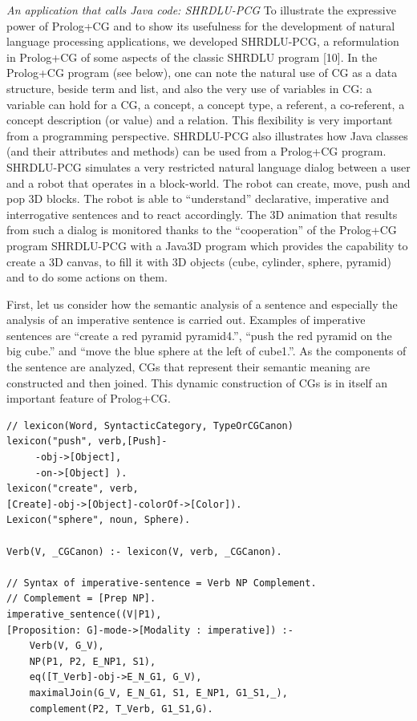 \documentclass{book}
\begin{document}
{\it An application that calls Java code: SHRDLU-PCG} To
illustrate the expressive power of Prolog+CG and to show its
usefulness for the development of natural language processing
applications, we developed SHRDLU-PCG, a reformulation in Prolog+CG of
some aspects of the classic SHRDLU program [10]. In the Prolog+CG
program (see below), one can note the natural use of CG as a data
structure, beside term and list, and also the very use of variables in
CG: a variable can hold for a CG, a concept, a concept type, a
referent, a co-referent, a concept description (or value) and a
relation. This flexibility is very important from a programming
perspective.  SHRDLU-PCG also illustrates how Java classes (and their
attributes and methods) can be used from a Prolog+CG program.
SHRDLU-PCG simulates a very restricted natural language dialog between
a user and a robot that operates in a block-world. The robot can
create, move, push and pop 3D blocks. The robot is able to
``understand'' declarative, imperative and interrogative sentences and
to react accordingly. The 3D animation that results from such a dialog
is monitored thanks to the ``cooperation'' of the Prolog+CG program
SHRDLU-PCG with a Java3D program which provides the capability to
create a 3D canvas, to fill it with 3D objects (cube, cylinder,
sphere, pyramid) and to do some actions on them.

First, let us consider how the semantic analysis of a sentence and
especially the analysis of an imperative sentence is carried out.
Examples of imperative sentences are ``create a red pyramid
pyramid4.'', ``push the red pyramid on the big cube.'' and ``move the
blue sphere at the left of cube1.''.  As the components of the
sentence are analyzed, CGs that represent their semantic meaning are
constructed and then joined. This dynamic construction of CGs is in
itself an important feature of Prolog+CG.


 
\begin{verbatim}
// lexicon(Word, SyntacticCategory, TypeOrCGCanon)
lexicon("push", verb,[Push]-
     -obj->[Object],
     -on->[Object] ).
lexicon("create", verb,
[Create]-obj->[Object]-colorOf->[Color]).
Lexicon("sphere", noun, Sphere).

Verb(V, _CGCanon) :- lexicon(V, verb, _CGCanon).

// Syntax of imperative-sentence = Verb NP Complement.
// Complement = [Prep NP].
imperative_sentence((V|P1),
[Proposition: G]-mode->[Modality : imperative]) :-
    Verb(V, G_V),
    NP(P1, P2, E_NP1, S1),
    eq([T_Verb]-obj->E_N_G1, G_V),
    maximalJoin(G_V, E_N_G1, S1, E_NP1, G1_S1,_),
    complement(P2, T_Verb, G1_S1,G).
\end{verbatim}
\end{document}
